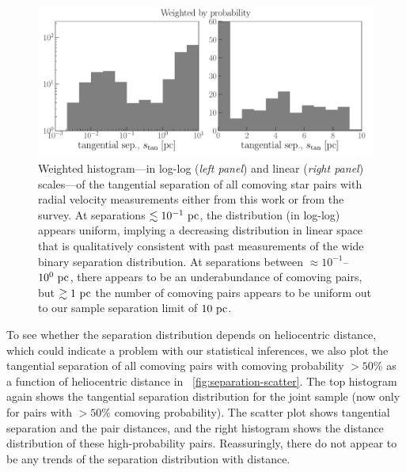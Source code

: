 \documentclass[modern, letterpaper]{aastex61}
\begin{document}
\begin{figure}[htb]
  \begin{center}
    \includegraphics[width=\linewidth]{separation-hist.pdf}
  \end{center}
  \caption{%
    Weighted histogram---in log-log (\emph{left panel}) and linear (\emph{right
    panel}) scales---of the tangential separation of all comoving star pairs
    with radial velocity measurements either from this work or from the
     survey.
    At separations $\lesssim 10^{-1}~\mathrm{pc}$, the distribution (in log-log) appears
    uniform, implying a decreasing distribution in linear space that is
    qualitatively consistent with past measurements of the wide binary
    separation distribution.
    At separations between $\approx 10^{-1}$--$10^{0}~\mathrm{pc}$, there appears to be
    an underabundance of comoving pairs, but $\gtrsim 1~\mathrm{pc}$ the number of
    comoving pairs appears to be uniform out to our sample separation limit of
    $10~\mathrm{pc}$.
    \label{fig:separation}}
\end{figure}

To see whether the separation distribution depends on heliocentric distance,
which could indicate a problem with our statistical inferences, we also plot the
tangential separation of all comoving pairs with comoving probability $> 50\%$
as a function of heliocentric distance in
\figurename~\ref{fig:separation-scatter}.
The top histogram again shows the tangential separation distribution for the
joint sample (now only for pairs with $> 50\%$ comoving probability).
The scatter plot shows tangential separation and the pair distances, and
the right histogram shows the distance distribution of these high-probability
pairs.
Reassuringly, there do not appear to be any trends of the separation
distribution with distance.
\end{document}
